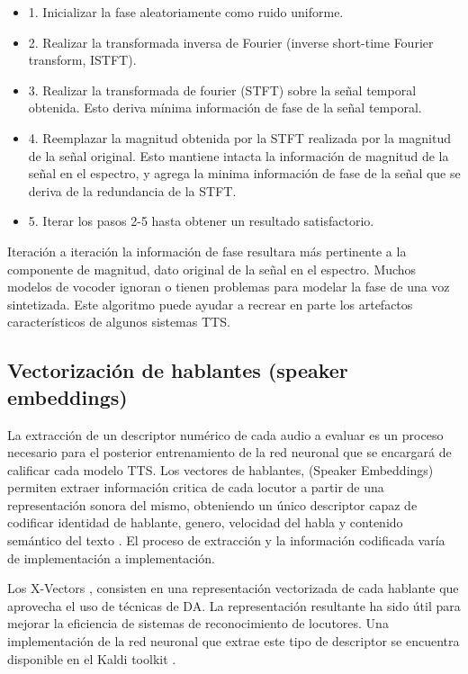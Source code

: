 \begin{itemize}
    \item 1. Inicializar la fase aleatoriamente como ruido uniforme.
    \item 2. Realizar la transformada inversa de Fourier (inverse short-time Fourier transform, ISTFT).
    \item 3. Realizar la transformada de fourier (STFT) sobre la señal temporal obtenida. Esto deriva mínima información de fase de la señal temporal.
    \item 4. Reemplazar la magnitud obtenida por la STFT realizada por la magnitud de la señal original. Esto mantiene intacta la información de magnitud de la señal en el espectro, y agrega la minima información de fase de la señal que se deriva de la redundancia de la STFT.
    \item 5. Iterar los pasos 2-5 hasta obtener un resultado satisfactorio.
\end{itemize}
Iteración a iteración la información de fase resultara más pertinente a la componente de magnitud, dato original de la señal en el espectro. Muchos modelos de vocoder ignoran o tienen problemas para modelar la fase de una voz sintetizada. Este algoritmo puede ayudar a recrear en parte los artefactos característicos de algunos sistemas TTS.

\subsection{Vectorización de hablantes (speaker embeddings)}

La extracción de un descriptor numérico de cada audio a evaluar es un proceso necesario para el posterior entrenamiento de la red neuronal que se encargará de calificar cada modelo TTS. Los vectores de hablantes, (Speaker Embeddings) permiten extraer información critica de cada locutor a partir de una representación sonora del mismo, obteniendo un único descriptor capaz de codificar identidad de hablante, genero, velocidad del habla y contenido semántico del texto \cite{SpeakerEmbedding}. El proceso de extracción y la información codificada varía de implementación a implementación.

Los X-Vectors \cite{xvectors}, consisten en una representación vectorizada de cada hablante que aprovecha el uso de técnicas de DA. La representación resultante ha sido útil para mejorar la eficiencia de sistemas de reconocimiento de locutores. Una implementación de la red neuronal que extrae este tipo de descriptor se encuentra disponible en el Kaldi toolkit \cite{kaldi}.

